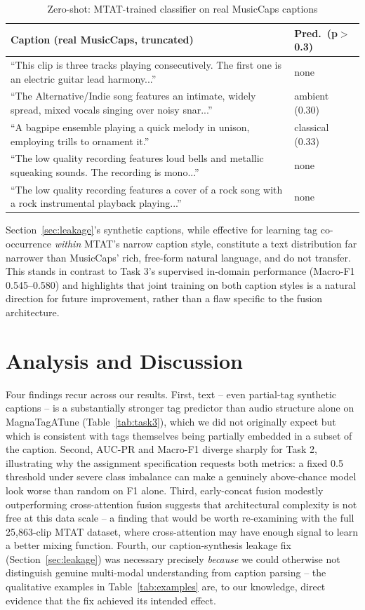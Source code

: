 \documentclass[conference]{IEEEtran}
\begin{document}
\begin{table}[h]
\centering
\caption{Zero-shot: MTAT-trained classifier on real MusicCaps captions}
\label{tab:zeroshot}
\small
\begin{tabular}{p{5.5cm}p{2cm}}
\toprule
Caption (real MusicCaps, truncated) & Pred.\ (p$>$0.3) \\
\midrule
``This clip is three tracks playing consecutively. The first one is an electric guitar lead harmony...'' & none \\
``The Alternative/Indie song features an intimate, widely spread, mixed vocals singing over noisy snar...'' & ambient (0.30) \\
``A bagpipe ensemble playing a quick melody in unison, employing trills to ornament it.'' & classical (0.33) \\
``The low quality recording features loud bells and metallic squeaking sounds. The recording is mono...'' & none \\
``The low quality recording features a cover of a rock song with a rock instrumental playback playing...'' & none \\
\bottomrule
\end{tabular}
\end{table}
Section~\ref{sec:leakage}'s synthetic captions, while effective for
learning tag co-occurrence \emph{within} MTAT's narrow caption style,
constitute a text distribution far narrower than MusicCaps' rich,
free-form natural language, and do not transfer. This stands in
contrast to Task 3's supervised in-domain performance (Macro-F1
0.545--0.580) and highlights that joint training on both caption
styles is a natural direction for future improvement, rather than a
flaw specific to the fusion architecture.

\section{Analysis and Discussion}
Four findings recur across our results. First, text -- even
partial-tag synthetic captions -- is a substantially stronger tag
predictor than audio structure alone on MagnaTagATune
(Table~\ref{tab:task3}), which we did not originally expect but which
is consistent with tags themselves being partially embedded in a
subset of the caption. Second, AUC-PR and Macro-F1 diverge sharply for
Task 2, illustrating why the assignment specification requests both
metrics: a fixed 0.5 threshold under severe class imbalance can make a
genuinely above-chance model look worse than random on F1 alone.
Third, early-concat fusion modestly outperforming cross-attention
fusion suggests that architectural complexity is not free at this data
scale -- a finding that would be worth re-examining with the full
25{,}863-clip MTAT dataset, where cross-attention may have enough
signal to learn a better mixing function. Fourth, our caption-synthesis
leakage fix (Section~\ref{sec:leakage}) was necessary precisely
\emph{because} we could otherwise not distinguish genuine multi-modal
understanding from caption parsing -- the qualitative examples in
Table~\ref{tab:examples} are, to our knowledge, direct evidence that
the fix achieved its intended effect.
\end{document}

